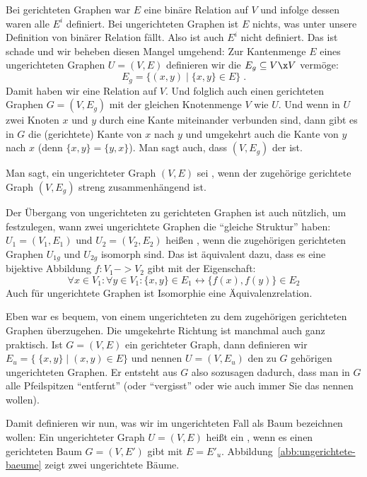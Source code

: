 Bei gerichteten Graphen war $E$ eine binäre Relation auf $V$ und
infolge dessen waren alle $E^i$ definiert.
% 
Bei ungerichteten Graphen ist $E$ nichts, was unter unsere Definition
von binärer Relation fällt.
% 
Also ist auch $E^i$ nicht definiert.
% 
Das ist schade und wir beheben diesen Mangel umgehend: Zur Kantenmenge
$E$ eines ungerichteten Graphen $U=(V,E)$ definieren wir die
 $E_g\subseteq V\x V$
vermöge:
\[ E_g = \{ (x,y) \mid \{x,y\} \in E \} \;.
\] Damit haben wir eine Relation auf $V$.
% 
Und folglich auch einen gerichteten Graphen $G=(V,E_g)$ mit der
gleichen Knotenmenge $V$ wie $U$.
% 
Und wenn in $U$ zwei Knoten $x$ und $y$ durch eine Kante miteinander
verbunden sind, dann gibt es in $G$ die (gerichtete) Kante von $x$
nach $y$ und umgekehrt auch die Kante von $y$ nach $x$ (denn
$\{x,y\}=\{y,x\}$).
% 
Man sagt auch, dass $(V,E_g)$ der 
ist.

Man sagt, ein ungerichteter Graph $(V,E)$ sei
,
wenn der zugehörige gerichtete Graph $(V,E_g)$ streng zusammenhängend
ist.

Der Übergang von ungerichteten zu gerichteten Graphen ist auch
nützlich, um festzulegen, wann zwei ungerichtete Graphen die "`gleiche
Struktur"' haben: $U_1=(V_1,E_1)$ und $U_2=(V_2,E_2)$ heißen
,
wenn die zugehörigen gerichteten Graphen $U_{1g}$ und $U_{2g}$
isomorph sind.
% 
Das ist äquivalent dazu, dass es eine bijektive Abbildung $f:V_1->
V_2$ gibt mit der Eigenschaft:
\[ \forall x\in V_1: \forall y\in V_1: \{x,y\}\in E_1 \longleftrightarrow
\{f(x),f(y)\}\in E_2
\] Auch für ungerichtete Graphen ist Isomorphie eine
Äquivalenzrelation.

Eben war es bequem, von einem ungerichteten zu dem zugehörigen
gerichteten Graphen überzugehen.
% 
Die umgekehrte Richtung ist manchmal auch ganz praktisch.
% 
Ist $G=(V,E)$ ein gerichteter Graph, dann definieren wir $E_u=\{ \;
\{x,y\} \mid (x,y) \in E \}$ und nennen $U=(V,E_u)$ den zu $G$
gehörigen ungerichteten Graphen.
% 
Er entsteht aus $G$ also sozusagen dadurch, dass man in $G$ alle
Pfeilspitzen "`entfernt"' (oder "`vergisst"' oder wie auch immer Sie
das nennen wollen).

Damit definieren wir nun, was wir im ungerichteten Fall als Baum
bezeichnen wollen: Ein ungerichteter Graph $U=(V,E)$ heißt ein
, wenn es einen gerichteten Baum
$G=(V,E')$ gibt mit $E=E'_u$.
% 
Abbildung~\ref{abb:ungerichtete-baeume} zeigt zwei ungerichtete Bäume.

